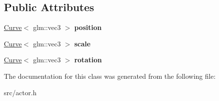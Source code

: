 \subsection*{Public Attributes}
\begin{DoxyCompactItemize}
\item 
\hypertarget{class_actor_a5acb451a91aa2cdc6abfb877d60a65e1}{}\hyperlink{class_curve}{Curve}$<$ glm\+::vec3 $>$ {\bfseries position}\label{class_actor_a5acb451a91aa2cdc6abfb877d60a65e1}

\item 
\hypertarget{class_actor_ac6d54863e68a37c67e83ab876ea82bc6}{}\hyperlink{class_curve}{Curve}$<$ glm\+::vec3 $>$ {\bfseries scale}\label{class_actor_ac6d54863e68a37c67e83ab876ea82bc6}

\item 
\hypertarget{class_actor_ac388bcd18a687f53ab9926d9379b782c}{}\hyperlink{class_curve}{Curve}$<$ glm\+::vec3 $>$ {\bfseries rotation}\label{class_actor_ac388bcd18a687f53ab9926d9379b782c}

\end{DoxyCompactItemize}


The documentation for this class was generated from the following file\+:\begin{DoxyCompactItemize}
\item 
src/actor.\+h\end{DoxyCompactItemize}
